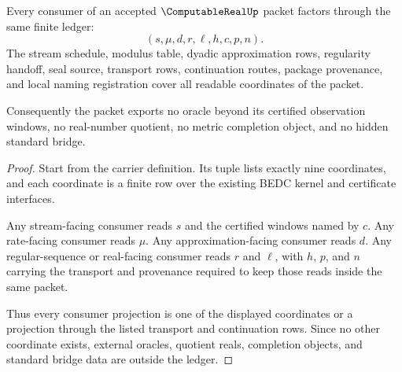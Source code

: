 \begin{theorem}
\label{thm:computable-real-ledger-coverage}
Every consumer of an accepted $\ComputableRealUp$ packet factors through the
same finite ledger:
$$
(s,\mu,d,r,\ell,h,c,p,n).
$$
The stream schedule, modulus table, dyadic approximation rows, regularity
handoff, seal source, transport rows, continuation routes, package provenance,
and local naming registration cover all readable coordinates of the packet.

Consequently the packet exports no oracle beyond its certified observation
windows, no real-number quotient, no metric completion object, and no hidden
standard bridge.
\end{theorem}
\begin{proof}
Start from the carrier definition. Its tuple lists exactly nine coordinates,
and each coordinate is a finite row over the existing BEDC kernel and
certificate interfaces.

Any stream-facing consumer reads $s$ and the certified windows named by $c$.
Any rate-facing consumer reads $\mu$. Any approximation-facing consumer reads
$d$. Any regular-sequence or real-facing consumer reads $r$ and $\ell$, with
$h$, $p$, and $n$ carrying the transport and provenance required to keep those
reads inside the same packet.

Thus every consumer projection is one of the displayed coordinates or a
projection through the listed transport and continuation rows. Since no other
coordinate exists, external oracles, quotient reals, completion objects, and
standard bridge data are outside the ledger.
\end{proof}

